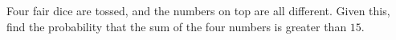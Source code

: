 Four fair dice are tossed, and the numbers on top are all different. Given this, find the probability that the sum of the four numbers is greater than $15$.
